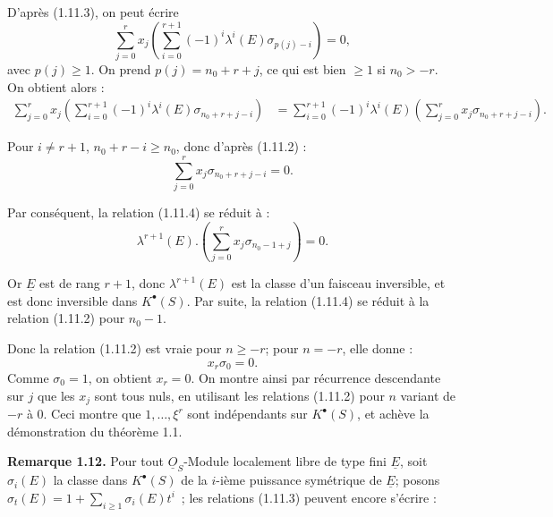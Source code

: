 
D'après (1.11.3), on
peut écrire
\begin{equation}\tag{1.11.4}
  \sum_{j=0}^r x_j\left(\sum_{i=0}^{r+1}(-1)^i\lambda^i(E)\sigma_{p(j)-i}\right)=0,
\end{equation}
avec \(p(j)\geq1\). On prend \(p(j)=n_0+r+j\), ce qui est bien \(\geq1\) si \(n_0>-r\). On obtient alors :
\[
\begin{aligned}
\sum_{j=0}^r x_j\left(\sum_{i=0}^{r+1}(-1)^i\lambda^i(E)\sigma_{n_0+r+j-i}\right)
&=\sum_{i=0}^{r+1}(-1)^i\lambda^i(E)
   \left(\sum_{j=0}^r x_j\sigma_{n_0+r+j-i}\right).
\end{aligned}
\]

Pour \(i\neq r+1\), \(n_0+r-i\geq n_0\), donc d'après (1.11.2) :
\[
  \sum_{j=0}^r x_j\sigma_{n_0+r+j-i}=0.
\]

Par conséquent, la relation (1.11.4) se réduit à :
\[
  \lambda^{r+1}(E).\left(\sum_{j=0}^r x_j\sigma_{n_0-1+j}\right)=0.
\]

Or \(\underline{E}\) est de rang \(r+1\), donc \(\lambda^{r+1}(E)\) est la classe d'un faisceau inversible, et est donc inversible dans \(K^{\bullet}(S)\). Par suite, la relation (1.11.4) se réduit à la relation (1.11.2) pour \(n_0-1\).

Donc la relation (1.11.2) est vraie pour \(n\geq-r\); pour \(n=-r\), elle donne :
\[
  x_r\sigma_0=0.
\]
Comme \(\sigma_0=1\), on obtient \(x_r=0\). On montre ainsi par récurrence descendante sur \(j\) que les \(x_j\) sont tous nuls, en utilisant les relations (1.11.2) pour \(n\) variant de \(-r\) à \(0\). Ceci montre que \(1,\ldots,\xi^r\) sont indépendants sur \(K^{\bullet}(S)\), et achève la démonstration du théorème 1.1.

\textbf{Remarque 1.12.} Pour tout \(\underline{O}_S\)-Module localement libre de type fini \(\underline{E}\), soit \(\sigma_i(E)\) la classe dans \(K^{\bullet}(S)\) de la \(i\)-ième puissance symétrique de \(\underline{E}\); posons \(\sigma_t(E)=1+\sum_{i\geq1}\sigma_i(E)t^i\)~; les relations (1.11.3) peuvent encore s'écrire :
